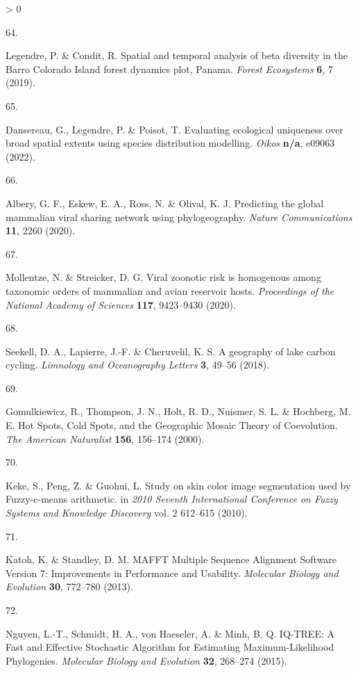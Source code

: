 \documentclass[10pt,oneside]{article}
\newlength{\cslhangindent}
\newlength{\csllabelwidth}
\newenvironment{CSLReferences}[3] %
 {%
  \setlength{\parindent}{0pt}
  \ifodd #1 \everypar{\setlength{\hangindent}{\cslhangindent}}\ignorespaces\fi
  \ifnum #2 > 0
  \setlength{\parskip}{#2\baselineskip}
  \fi
 }%
 {}
\newcommand{\CSLLeftMargin}[1]{\parbox[t]{\maxof{\widthof{#1}}{\csllabelwidth}}{#1}}
\newcommand{\CSLRightInline}[1]{\parbox[t]{\linewidth}{#1}}
\begin{document}
\begin{CSLReferences}{0}{0}
\leavevmode\hypertarget{ref-Legendre2019Spatial}{}%
\CSLLeftMargin{64. }
\CSLRightInline{Legendre, P. \& Condit, R. Spatial and temporal analysis
of beta diversity in the Barro Colorado Island forest dynamics plot,
Panama. \emph{Forest Ecosystems} \textbf{6}, 7 (2019).}

\leavevmode\hypertarget{ref-Dansereau2022Evaluating}{}%
\CSLLeftMargin{65. }
\CSLRightInline{Dansereau, G., Legendre, P. \& Poisot, T. Evaluating
ecological uniqueness over broad spatial extents using species
distribution modelling. \emph{Oikos} \textbf{n/a}, e09063 (2022).}

\leavevmode\hypertarget{ref-Albery2020Predicting}{}%
\CSLLeftMargin{66. }
\CSLRightInline{Albery, G. F., Eskew, E. A., Ross, N. \& Olival, K. J.
Predicting the global mammalian viral sharing network using
phylogeography. \emph{Nature Communications} \textbf{11}, 2260 (2020).}

\leavevmode\hypertarget{ref-Mollentze2020Viral}{}%
\CSLLeftMargin{67. }
\CSLRightInline{Mollentze, N. \& Streicker, D. G. Viral zoonotic risk is
homogenous among taxonomic orders of mammalian and avian reservoir
hosts. \emph{Proceedings of the National Academy of Sciences}
\textbf{117}, 9423--9430 (2020).}

\leavevmode\hypertarget{ref-Seekell2018Geography}{}%
\CSLLeftMargin{68. }
\CSLRightInline{Seekell, D. A., Lapierre, J.-F. \& Cheruvelil, K. S. A
geography of lake carbon cycling. \emph{Limnology and Oceanography
Letters} \textbf{3}, 49--56 (2018).}

\leavevmode\hypertarget{ref-Gomulkiewicz2000Hot}{}%
\CSLLeftMargin{69. }
\CSLRightInline{Gomulkiewicz, R., Thompson, J. N., Holt, R. D., Nuismer,
S. L. \& Hochberg, M. E. Hot Spots, Cold Spots, and the Geographic
Mosaic Theory of Coevolution. \emph{The American Naturalist}
\textbf{156}, 156--174 (2000).}

\leavevmode\hypertarget{ref-Keke2010Study}{}%
\CSLLeftMargin{70. }
\CSLRightInline{Keke, S., Peng, Z. \& Guohui, L. Study on skin color
image segmentation used by Fuzzy-c-means arithmetic. in \emph{2010
Seventh International Conference on Fuzzy Systems and Knowledge
Discovery} vol. 2 612--615 (2010).}

\leavevmode\hypertarget{ref-Katoh2013Mafft}{}%
\CSLLeftMargin{71. }
\CSLRightInline{Katoh, K. \& Standley, D. M. MAFFT Multiple Sequence
Alignment Software Version 7: Improvements in Performance and Usability.
\emph{Molecular Biology and Evolution} \textbf{30}, 772--780 (2013).}

\leavevmode\hypertarget{ref-Nguyen2015Iqtree}{}%
\CSLLeftMargin{72. }
\CSLRightInline{Nguyen, L.-T., Schmidt, H. A., von Haeseler, A. \& Minh,
B. Q. IQ-TREE: A Fast and Effective Stochastic Algorithm for Estimating
Maximum-Likelihood Phylogenies. \emph{Molecular Biology and Evolution}
\textbf{32}, 268--274 (2015).}


\end{CSLReferences}
\end{document}
